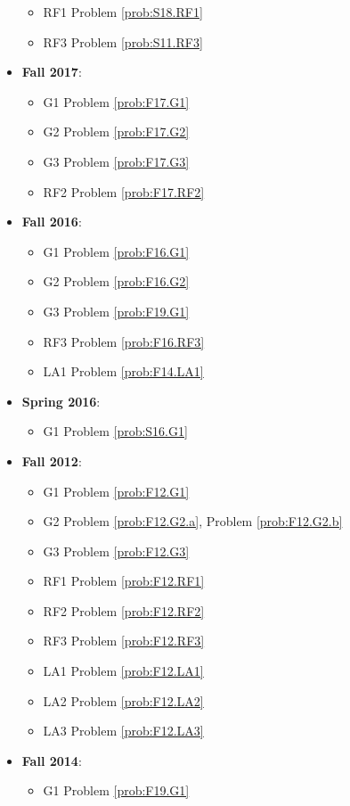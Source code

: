 \documentclass{article}
\theoremstyle{definition}
\begin{document}
\begin{itemize}
\begin{itemize}
		\item RF1 Problem \ref{prob:S18.RF1}
		\item RF3 Problem \ref{prob:S11.RF3}
	\end{itemize}
	\item \textbf{Fall 2017}:
	\begin{itemize}
		\item G1 Problem \ref{prob:F17.G1}
		\item G2 Problem \ref{prob:F17.G2}
		\item G3 Problem \ref{prob:F17.G3}
		\item RF2 Problem \ref{prob:F17.RF2}
	\end{itemize}
	\item \textbf{Fall 2016}:
	\begin{itemize}
		\item G1 Problem \ref{prob:F16.G1}
		\item G2 Problem \ref{prob:F16.G2}
		\item G3 Problem \ref{prob:F19.G1}
		\item RF3 Problem \ref{prob:F16.RF3}
		\item LA1 Problem \ref{prob:F14.LA1}
	\end{itemize}
	\item \textbf{Spring 2016}:
	\begin{itemize}
		\item G1 Problem \ref{prob:S16.G1}
	\end{itemize}
	\item \textbf{Fall 2012}:	
	\begin{itemize}
	\item G1 Problem \ref{prob:F12.G1} 
	\item G2 Problem \ref{prob:F12.G2.a}, Problem \ref{prob:F12.G2.b}
	\item G3 Problem \ref{prob:F12.G3}
	\item RF1 Problem \ref{prob:F12.RF1}
	\item RF2 Problem \ref{prob:F12.RF2}
	\item RF3 Problem \ref{prob:F12.RF3}
	\item LA1 Problem \ref{prob:F12.LA1}
	\item LA2 Problem \ref{prob:F12.LA2}
	\item LA3 Problem \ref{prob:F12.LA3}	
	\end{itemize}	
	\item \textbf{Fall 2014}:  
	\begin{itemize}
	\item G1 Problem \ref{prob:F19.G1} 

\end{itemize}
\end{itemize}
\end{document}
